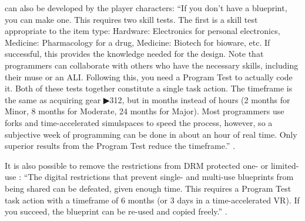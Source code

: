 \begin{enumerate}
     can also be developed by the player characters: “If you don’t have a blueprint, you can make one. This requires two skill tests. The first is a skill test appropriate to the item type: Hardware: Electronics for personal electronics, Medicine: Pharmacology for a drug, Medicine: Biotech for bioware, etc. If successful, this provides the knowledge needed for the design. Note that programmers can collaborate with others who have the necessary skills, including their muse or an ALI. Following this, you need a Program Test to actually code it. Both of these tests together constitute a single task action. The timeframe is the same as acquiring gear ▶312, but in months instead of hours (2 months for Minor, 8 months for Moderate, 24 months for Major). Most programmers use forks and time-accelerated simulspaces to speed the process, however, so a subjective week of programming can be done in about an hour of real time. Only superior results from the Program Test reduce the timeframe.” \citep[pg. 314]{ep2e_1.1_2019}.

    It is also possible to remove the restrictions from DRM protected one- or limited-use : “The digital restrictions that prevent single- and multi-use blueprints from being shared can be defeated, given enough time. This requires a Program Test task action with a timeframe of 6 months (or 3 days in a time-accelerated VR). If you succeed, the blueprint can be re-used and copied freely.” \citep[pg. 314]{ep2e_1.1_2019}.
\end{enumerate}